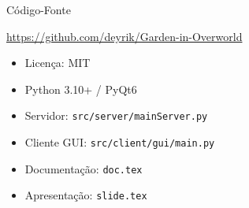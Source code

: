 \documentclass[aspectratio=169]{beamer}
\begin{document}
\begin{frame}{C\'odigo-Fonte}
  \begin{center}
    \url{https://github.com/deyrik/Garden-in-Overworld}
  \end{center}
  \vfill
  \begin{itemize}
    \item Licen\c{c}a: MIT
    \item Python 3.10+ / PyQt6
    \item Servidor: \texttt{src/server/mainServer.py}
    \item Cliente GUI: \texttt{src/client/gui/main.py}
    \item Documenta\c{c}\~ao: \texttt{doc.tex}
    \item Apresenta\c{c}\~ao: \texttt{slide.tex}
  \end{itemize}
\end{frame}
\end{document}

